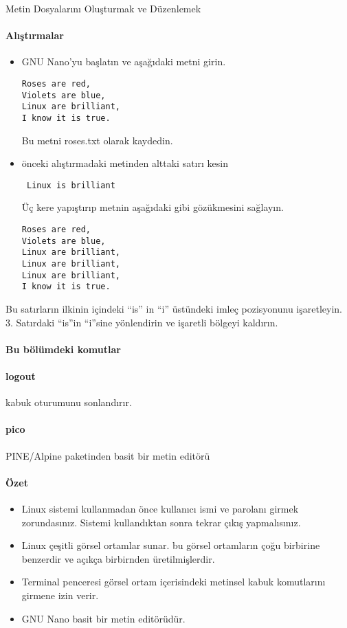 \documentclass[10pt,a5paper]{book}
\begin{document}
\begin{section}{Metin Dosyalarını Oluşturmak ve Düzenlemek}
\paragraph{Alıştırmalar}{
\begin{itemize}
 \item GNU Nano’yu başlatın ve aşağıdaki metni girin.
 \begin{verbatim}
Roses are red,
Violets are blue,
Linux are brilliant,
I know it is true.
 \end{verbatim}Bu metni roses.txt olarak kaydedin.
 \item önceki alıştırmadaki metinden alttaki satırı kesin
 \begin{verbatim}
 Linux is brilliant
 \end{verbatim}
 Üç kere yapıştırıp metnin aşağıdaki gibi gözükmesini sağlayın.
 \begin{verbatim}
Roses are red,
Violets are blue,
Linux are brilliant,
Linux are brilliant,
Linux are brilliant,
I know it is true.
 \end{verbatim}
\end{itemize}}
Bu satırların ilkinin içindeki “is” in “i” üstündeki imleç pozisyonunu işaretleyin. 3. Satırdaki “is”in “i”sine yönlendirin ve işaretli bölgeyi kaldırın.
\end{section}
\paragraph{Bu bölümdeki komutlar}{
\paragraph{logout}{kabuk oturumunu sonlandırır.}
\paragraph{pico}{PINE/Alpine paketinden basit bir metin editörü}
}

\paragraph{Özet}{
\begin{itemize}
\item Linux sistemi kullanmadan önce kullanıcı ismi ve parolanı girmek zorundasınız. Sistemi kullandıktan sonra tekrar çıkış yapmalısınız.
\item Linux çeşitli görsel ortamlar sunar. bu görsel ortamların çoğu birbirine benzerdir ve açıkça birbirnden üretilmişlerdir.
\item Terminal penceresi görsel ortam içerisindeki metinsel kabuk komutlarını girmene izin verir. 
\item GNU Nano basit bir metin editörüdür.
\end{itemize}
}
\end{document}
